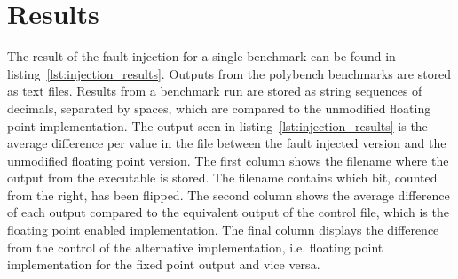 \section{Results}




The result of the fault injection for a single benchmark can be found in listing~\ref{lst:injection_results}. Outputs from the polybench benchmarks are stored as text files. Results from a benchmark run are stored as string sequences of decimals, separated by spaces, which are compared to the unmodified floating point implementation. The output seen in listing~\ref{lst:injection_results} is the average difference per value in the file between the fault injected version and the unmodified floating point version.  
The first column shows the filename where the output from the executable is stored. The filename contains which bit, counted from the right, has been flipped. The second column shows the average difference of each output compared to the equivalent output of the control file, which is the floating point enabled implementation. The final column displays the difference from the control of the alternative implementation, i.e. floating point implementation for the fixed point output and vice versa.

